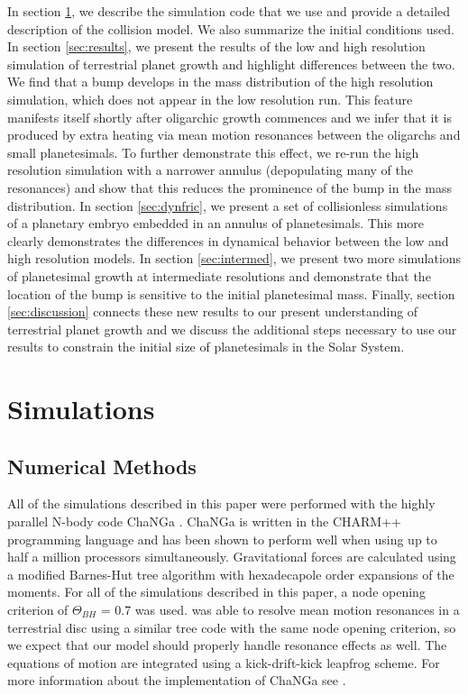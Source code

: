 \documentclass [11pt, proquest] {uwthesis}[2020/02/24]
\begin{document}
In section \ref{sec:sim}, we describe the simulation code that we use and provide a detailed description of the collision model. 
We also summarize the initial conditions used. In section \ref{sec:results}, we present the results of the low and high resolution 
simulation of terrestrial planet growth and highlight differences between the two. We find that a bump develops in the mass 
distribution of the high resolution simulation, which does not appear in the low resolution run. This feature manifests itself shortly 
after oligarchic growth commences and we infer that it is produced by extra heating via mean motion resonances between the 
oligarchs and small planetesimals. To further demonstrate this effect, we re-run the high resolution simulation with a narrower 
annulus (depopulating many of the resonances) and show that this reduces the prominence of the bump in the mass distribution. 
In section \ref{sec:dynfric}, we present a set of collisionless simulations of a planetary embryo embedded in an annulus of 
planetesimals. This more clearly demonstrates the differences in dynamical behavior between the low and high resolution 
models. In section \ref{sec:intermed}, we present two more simulations of planetesimal growth at intermediate resolutions and 
demonstrate that the location of the bump is sensitive to the initial planetesimal mass. Finally, section \ref{sec:discussion} 
connects these new results to our present understanding of terrestrial planet growth and we discuss the additional steps 
necessary to use our results to constrain the initial size of planetesimals in the Solar System.

\section{Simulations} \label{sec:sim}

\subsection{Numerical Methods} \label{sec:numerical}

All of the simulations described in this paper were performed with the highly parallel N-body code {\sc ChaNGa} . 
{\sc ChaNGa} is written in the {\sc CHARM++} programming language and has been shown to perform well when using up to 
half a million processors \cite{menon15} simultaneously. Gravitational forces are calculated using a modified Barnes-Hut tree 
algorithm with hexadecapole order expansions of the moments. For all of the simulations described in this paper, a node 
opening criterion of $\Theta_{BH}$ = 0.7 was used. \cite{richardson00} was able to resolve mean motion resonances in a 
terrestrial disc using a similar tree code with the same node opening criterion, so we expect that our model should properly 
handle resonance effects as well. The equations of motion are integrated using a kick-drift-kick leapfrog scheme. For more 
information about the implementation of {\sc ChaNGa} see \cite{jetley08}.
\end{document}
